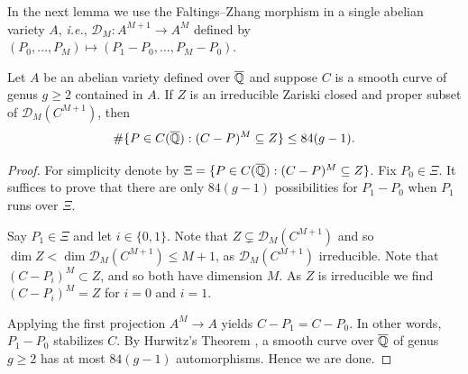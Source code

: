 In the next lemma we use the Faltings--Zhang morphism in a single
abelian variety $A$, \textit{i.e.}, $\mathscr{D}_M \colon
A^{M+1}\rightarrow A^M$ defined by $(P_0,\ldots,P_M)\mapsto
(P_1-P_0,\ldots,P_M-P_0)$. 

\begin{lemma}\label{LemmaPacketsAlternative3}
  Let $A$ be an abelian variety defined over $\overline{{\mathbb{Q}}}$ and
  suppose $C$ is a smooth curve of genus $g\ge
  2$ contained in $A$. If $Z$ is an irreducible Zariski
  closed and proper subset of $\mathscr{D}_M(C^{M+1})$, 
  then
  \begin{equation*}
    \#\{ P \in C(\overline{{\mathbb{Q}}}) : (C-P)^M \subseteq Z
    \} \le 84(g-1).
  \end{equation*}
\end{lemma}
\begin{proof}
For simplicity denote by $\Xi = \{ P \in C(\overline{{\mathbb{Q}}}) : (C-P)^M
\subseteq Z \}$. %
%
Fix $P_0\in \Xi$. It suffices to prove that there are only $84(g-1)$
possibilities for $P_1 - P_0$ when $P_1$ runs over $\Xi$.

Say $P_1 \in \Xi$ and let $i\in \{0,1\}$. 
Note that
$Z\subsetneq \mathscr{D}_M(C^{M+1})$ and so
 $\dim Z < \dim \mathscr{D}_M(C^{M+1})\le M+1$, 
as $\mathscr{D}_M(C^{M+1})$ irreducible. 
Note that $(C-P_i)^M\subset Z$, and so both have dimension $M$.
As $Z$ is irreducible we find 
 $(C - P_i)^M=Z$ for $i=0$ and $i=1$.

Applying the first projection  $A^M\rightarrow A$ yields $C-P_1=C-P_0$. In other words, $P_1-P_0$
stabilizes $C$. By Hurwitz's Theorem \cite{Hurwitz1892}, a smooth curve over ${\overline{\mathbb{Q}}}$ of
genus $g\ge 2$ has at most $84(g-1)$ automorphisms.
Hence we are done.
\end{proof}

